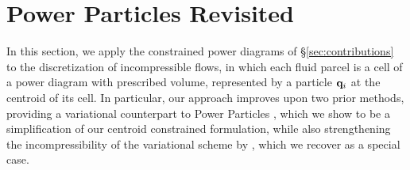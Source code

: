 \documentclass[main.tex]{subfiles}
\begin{document}

\section{Power Particles Revisited}
\label{sec:flow}

In this section, we apply the constrained power diagrams of \S\ref{sec:contributions} to the discretization of incompressible flows, in which each fluid parcel is a cell of a power diagram with prescribed volume, represented by a particle $\mathbf{q}_i$ at the centroid of its cell.
In particular, our approach improves upon two prior methods, providing a variational counterpart to Power Particles \cite{deGoes2015PowerParticles}, which we show to be a simplification of our centroid constrained formulation, while also strengthening the incompressibility of the variational scheme by \citet{Gallouet2018Lagrangian}, which we recover as a special case.
\end{document}
